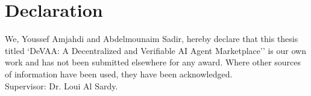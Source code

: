 ﻿\chapter*{Declaration}
We, Youssef Amjahdi and Abdelmounaim Sadir, hereby declare that this thesis titled `DeVAA: A Decentralized and Verifiable AI Agent Marketplace'' is our own work and has not been submitted elsewhere for any award. Where other sources of information have been used, they have been acknowledged.\\[1em]
Supervisor: Dr. Loui Al Sardy.
